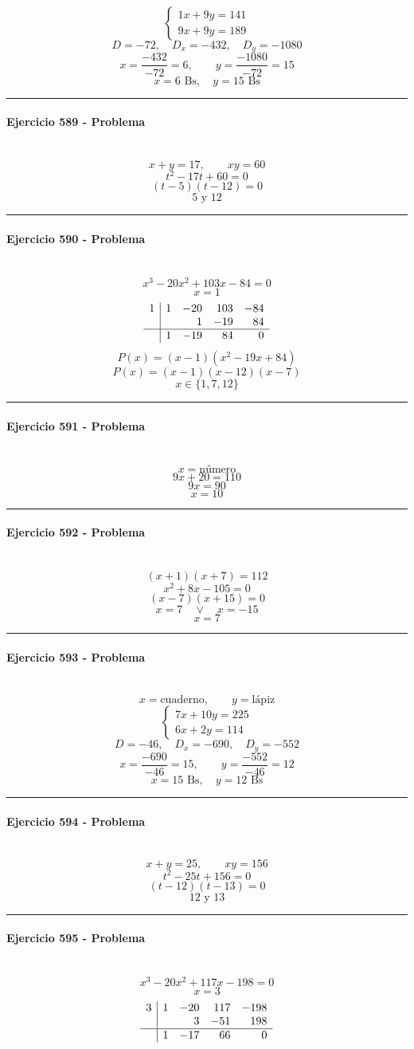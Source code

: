 \documentclass[10pt,a4paper]{article}
\newcommand{\res}[1]{\paragraph{#1}\mbox{}\\[-1.2em]}
\begin{document}
\[ \begin{cases}1x+9y=141\\9x+9y=189\end{cases} \]
\[ D=-72,\quad D_x=-432,\quad D_y=-1080 \]
\[ x=\frac{-432}{-72}=6,\qquad y=\frac{-1080}{-72}=15 \]
\[ \boxed{x=6\text{ Bs},\quad y=15\text{ Bs}} \]
\vspace{1mm}\hrule\vspace{2mm}
\res{Ejercicio 589 - Problema}
\[ x+y=17,\qquad xy=60 \]
\[ t^2-17t+60=0 \]
\[ (t-5)(t-12)=0 \]
\[ \boxed{5\text{ y }12} \]
\vspace{1mm}\hrule\vspace{2mm}
\res{Ejercicio 590 - Problema}
\[ x^{3} - 20 x^{2} + 103 x - 84=0 \]
\[ x=1 \]
\[\begin{array}{r|rrrr}1 & 1 & -20 & 103 & -84\\  &  & 1 & -19 & 84\\\hline  & 1 & -19 & 84 & 0\end{array}\]
\[ P(x)=(x-1)(x^{2} - 19 x + 84) \]
\[ P(x)=(x-1)(x-12)(x-7) \]
\[ \boxed{x\in\{1,7,12\}} \]
\vspace{1mm}\hrule\vspace{2mm}
\res{Ejercicio 591 - Problema}
\[ x=\text{número} \]
\[ 9x+20=110 \]
\[ 9x=90 \]
\[ \boxed{x=10} \]
\vspace{1mm}\hrule\vspace{2mm}
\res{Ejercicio 592 - Problema}
\[ (x+1)(x+7)=112 \]
\[ x^{2} + 8 x - 105=0 \]
\[ (x-7)(x+15)=0 \]
\[ x=7\quad \vee \quad x=-15 \]
\[ \boxed{x=7} \]
\vspace{1mm}\hrule\vspace{2mm}
\res{Ejercicio 593 - Problema}
\[ x=\text{cuaderno},\qquad y=\text{lápiz} \]
\[ \begin{cases}7x+10y=225\\6x+2y=114\end{cases} \]
\[ D=-46,\quad D_x=-690,\quad D_y=-552 \]
\[ x=\frac{-690}{-46}=15,\qquad y=\frac{-552}{-46}=12 \]
\[ \boxed{x=15\text{ Bs},\quad y=12\text{ Bs}} \]
\vspace{1mm}\hrule\vspace{2mm}
\res{Ejercicio 594 - Problema}
\[ x+y=25,\qquad xy=156 \]
\[ t^2-25t+156=0 \]
\[ (t-12)(t-13)=0 \]
\[ \boxed{12\text{ y }13} \]
\vspace{1mm}\hrule\vspace{2mm}
\res{Ejercicio 595 - Problema}
\[ x^{3} - 20 x^{2} + 117 x - 198=0 \]
\[ x=3 \]
\[\begin{array}{r|rrrr}3 & 1 & -20 & 117 & -198\\  &  & 3 & -51 & 198\\\hline  & 1 & -17 & 66 & 0\end{array}\]
\end{document}
